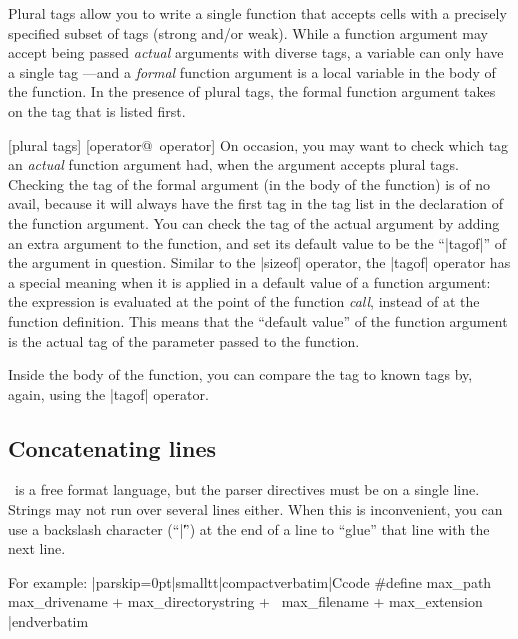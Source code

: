 Plural tags allow you to write a single function that accepts cells with a
precisely specified subset of tags (strong and\slash or weak). While a function
argument may accept being passed {\it actual\/} arguments with diverse tags,
a variable can only have a single tag ---and a {\it formal\/} function argument
is a local variable in the body of the function. In the presence of plural tags,
the formal function argument takes on the tag that is listed first.

 [plural tags] [operator@\midtilde\ operator]
On occasion, you may want to check which tag an {\it actual\/} function argument
had, when the argument accepts plural tags. Checking the tag of the formal argument
(in the body of the function) is of no avail, because it will always have the
first tag in the tag list in the declaration of the function argument. You can
check the tag of the actual argument by adding an extra argument to the function,
and set its default value to be the ``|tagof|'' of the argument in question.
%
Similar to the |sizeof| operator, the |tagof| operator has a special meaning
when it is applied in a default value of a function argument: the expression
is evaluated at the point of the function {\it call}, instead of at the function
definition. This means that the ``default value'' of the function argument is
the actual tag of the parameter passed to the function.

Inside the body of the function, you can compare the tag to known tags by, again,
using the |tagof| operator.


\subsection{Concatenating lines}
\noindent{}%
\Small\ is a free format language, but the parser directives must be on a single
line. Strings may not run over several lines either. When this is
inconvenient, you can use a backslash character (``|\|'') at the end of a line
to ``glue'' that line with the next line.

\goodbreak
For example:
\listingx\verbatim|parskip=0pt|smalltt|compactverbatim|Ccode
#define max_path        max_drivename + max_directorystring + \
                        max_filename + max_extension
|endverbatim\endlistingx

